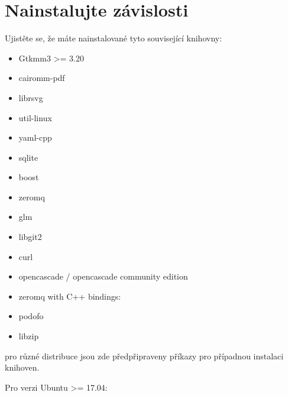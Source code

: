\documentclass[letterpaper,10pt,czech]{sphinxmanual}
\begin{document}
\section{Nainstalujte závislosti}
\label{\detokenize{build-linux_cz:nainstalujte-zavislosti}}
Ujistěte se, že máte nainstalované tyto související knihovny:
\begin{itemize}
\item {} 
Gtkmm3 \textgreater{}= 3.20

\item {} 
cairomm-pdf

\item {} 
librsvg

\item {} 
util-linux

\item {} 
yaml-cpp

\item {} 
sqlite

\item {} 
boost

\item {} 
zeromq

\item {} 
glm

\item {} 
libgit2

\item {} 
curl

\item {} 
opencascade / opencascade community edition

\item {} 
zeromq with C++ bindings: 

\item {} 
podofo

\item {} 
libzip

\end{itemize}

pro různé distribuce jsou zde předpřipraveny příkazy pro případnou instalaci knihoven.

Pro verzi Ubuntu \textgreater{}= 17.04:
\end{document}
